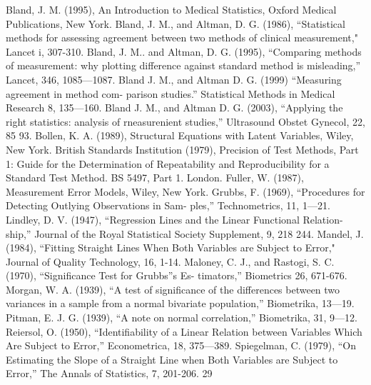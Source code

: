Bland, J. M. (1995), An Introduction to Medical Statistics, Oxford Medical
Publications, New York.
Bland, J. M., and Altman, D. G. (1986), “Statistical methods for assessing
agreement between two methods of clinical measurement," Lancet i, 307-310.
Bland, J. M.. and Altman, D. G. (1995), “Comparing methods of measurement:
why plotting difference against standard method is misleading,” Lancet, 346,
1085—1087.
Bland J. M., and Altman D. G. (1999) “Measuring agreement in method com-
parison studies.” Statistical Methods in Medical Research 8, 135—160.
Bland J. M., and Altman D. G. (2003), “Applying the right statistics: analysis
of rneasurenient studies,” Ultrasound Obstet Gynecol, 22, 85 93.
Bollen, K. A. (1989), Structural Equations with Latent Variables, Wiley, New
York.
British Standards Institution (1979), Precision of Test Methods, Part 1: Guide
for the Determination of Repeatability and Reproducibility for a Standard Test
Method. BS 5497, Part 1. London.
Fuller, W. (1987), Measurement Error Models, Wiley, New York.
Grubbs, F. (1969), “Procedures for Detecting Outlying Observations in Sam-
ples,” Technometrics, 11, 1—21.
Lindley, D. V. (1947), “Regression Lines and the Linear Functional Relation-
ship,” Journal of the Royal Statistical Society Supplement, 9, 218 244.
Mandel, J. (1984), “Fitting Straight Lines When Both Variables are Subject to
Error," Journal of Quality Technology, 16, 1-14.
Maloney, C. J., and Rastogi, S. C. (1970), “Signiﬁcance Test for Grubbs”s Es-
timators,” Biometrics 26, 671-676.
Morgan, W. A. (1939), “A test of signiﬁcance of the differences between two
variances in a sample from a normal bivariate population,” Biometrika, 13—19.
Pitman, E. J. G. (1939), “A note on normal correlation,” Biometrika, 31, 9—12.
Reiersol, O. (1950), “Identiﬁability of a Linear Relation between Variables
Which Are Subject to Error,” Econometrica, 18, 375—389.
Spiegelman, C. (1979), “On Estimating the Slope of a Straight Line when Both
Variables are Subject to Error,” The Annals of Statistics, 7, 201-206.
29




